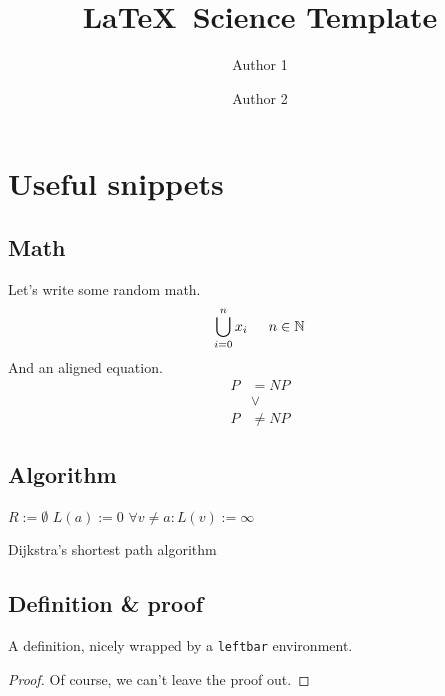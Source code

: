 \documentclass[a4paper]{article}
\begin{document}
	\title{\LaTeX\ Science Template}
	\author{Author 1 \and Author 2}
	\maketitle
	
	\pagebreak
	
	\tableofcontents
	\pagebreak
	
	\section{Useful snippets}
	
	\subsection{Math}
	Let's write some random math.
	\[ \bigcup_{i=0}^{n} x_i \indent n \in \mathbb{N} \]
	And an aligned equation.
	\begin{equation}
		\begin{split}
			P &= NP\\
			&\vee \\
			P&\neq NP
		\end{split}
	\end{equation}
	
	\subsection{Algorithm}
	\begin{algorithm}[H]
		$R:=\emptyset$\;
		$L(a):=0$\;
		$\forall v\neq a:L(v):=\infty$\;
		\caption{Dijkstra's shortest path algorithm}
	\end{algorithm}
	
	\subsection{Definition \& proof}
	\begin{leftbar}
		\begin{definition}
			A definition, nicely wrapped by a \texttt{leftbar} environment.
		\end{definition}
	\end{leftbar}
	\begin{proof}
		Of course, we can't leave the proof out.
	\end{proof}
\end{document}
